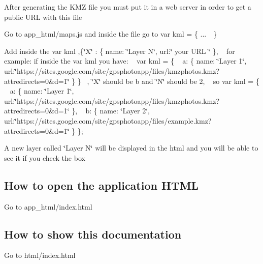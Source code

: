 \begin{DoxyEnumerate}
\item After generating the K\+MZ file you must put it in a web server in order to get a public U\+RL with this file 
\item Go to app\+\_\+html/maps.\+js and inside the file go to var kml = \{ ...　\} 
\item Add inside the var kml ,\{\char`\"{}\+X\char`\"{} \+: \{ name\+: \char`\"{}\+Layer N\char`\"{}, url\+:\char`\"{} your U\+R\+L \char`\"{} \}, ~\newline
for example\+: if inside the var kml you have\+: ~\newline
var kml = \{ ~\newline
a\+: \{ name\+: \char`\"{}\+Layer 1\char`\"{}, url\+:\char`\"{}https\+://sites.\+google.\+com/site/gpsphotoapp/files/kmzphotos.\+kmz?attredirects=0\&d=1\char`\"{} \} \}~\newline
, \char`\"{}\+X\char`\"{} should be b and \char`\"{}\+N\char`\"{} should be 2, ~\newline
so var kml = \{ ~\newline
a\+: \{ name\+: \char`\"{}\+Layer 1\char`\"{}, url\+:\char`\"{}https\+://sites.\+google.\+com/site/gpsphotoapp/files/kmzphotos.\+kmz?attredirects=0\&d=1\char`\"{} \}, ~\newline
b\+: \{ name\+: \char`\"{}\+Layer 2\char`\"{}, url\+:\char`\"{}https\+://sites.\+google.\+com/site/gpsphotoapp/files/example.\+kmz?attredirects=0\&d=1\char`\"{} \} \};  
\item A new layer called \char`\"{}\+Layer N\char`\"{} will be displayed in the html and you will be able to see it if you check the box 
\end{DoxyEnumerate}

\subsection*{How to open the application H\+T\+ML}


\begin{DoxyEnumerate}
\item Go to app\+\_\+html/index.\+html 
\end{DoxyEnumerate}

\subsection*{How to show this documentation}


\begin{DoxyEnumerate}
\item Go to html/index.\+html 
\end{DoxyEnumerate}

